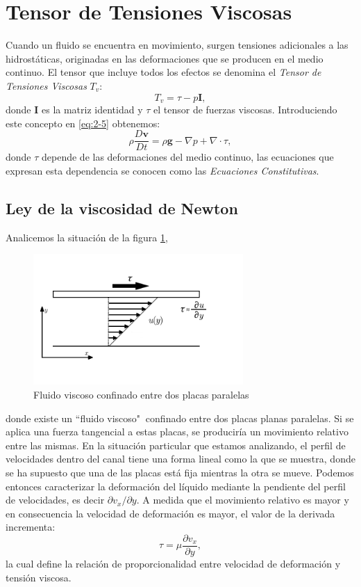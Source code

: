 \documentclass[a4paper,10pt, oneside]{book}
\begin{document}
\section{Tensor de Tensiones Viscosas}

Cuando un fluido se encuentra en movimiento, surgen tensiones adicionales a las hidrostáticas, originadas en las deformaciones que se producen en el medio continuo. El tensor que incluye todos los efectos se denomina el \textit{Tensor de Tensiones Viscosas} $T_v$:
\begin{equation}
	T_v = \tau - p \mathbf{I}, \nonumber
\end{equation}
donde $\mathbf{I}$ es la matriz identidad y $\tau$ el tensor de fuerzas viscosas. Introduciendo este concepto en \ref{eq:2-5} obtenemos:
\begin{equation}
	\rho \frac{D \mathbf{v}}{Dt} = \rho \mathbf{g} -\nabla p + \nabla \cdot \tau,
	\label{eq:2-6}
\end{equation}
donde $\tau$ depende de las deformaciones del medio continuo, las ecuaciones que expresan esta dependencia se conocen como las \textit{Ecuaciones Constitutivas}.

\subsection{Ley de la viscosidad de Newton}

Analicemos la situación de la figura \ref{img:1-5},
\begin{figure}[h!]
	\centering
	\includegraphics[width=8cm]{Img/1-5}
	\caption{Fluido viscoso confinado entre dos placas paralelas}
	\label{img:1-5}
\end{figure}
donde existe un ``fluido viscoso" $~$confinado entre dos placas planas paralelas. Si se aplica una fuerza tangencial a estas placas, se produciría un movimiento relativo entre las mismas. En la situación particular que estamos analizando, el perfil de velocidades dentro del canal tiene una forma lineal como la que se muestra, donde se ha supuesto que una de las placas está fija mientras la otra se mueve. Podemos entonces caracterizar la deformación del líquido mediante la pendiente del perfil de velocidades, es decir $\partial v_x / \partial y$. A medida que el movimiento relativo es mayor y en consecuencia la velocidad de deformación es mayor, el valor de la derivada incrementa:
\begin{equation}
	\tau = \mu \frac{\partial v_x}{\partial y}, \nonumber
\end{equation}
la cual define la relación de proporcionalidad entre velocidad de deformación y tensión viscosa.
\end{document}
